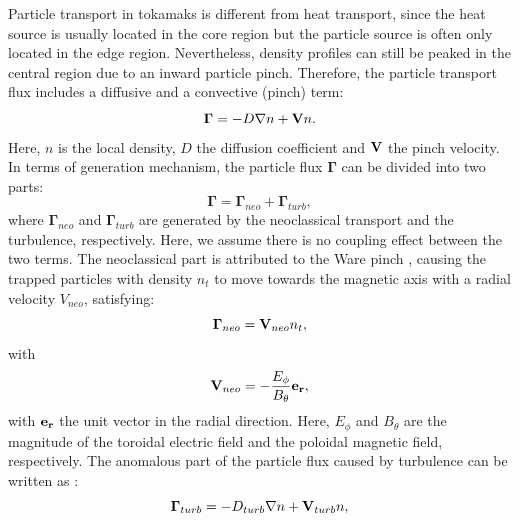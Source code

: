Particle transport in tokamaks is different from heat transport, since the heat source is usually located in the core region but the particle source is often only located in the edge region. Nevertheless, density profiles can still be peaked in the central region due to an inward particle pinch. Therefore, the particle transport flux includes a diffusive and a convective (pinch) term:%
\begin{equation}\label{eq:particle_flux}
  \boldsymbol{\Gamma} = -D\nabla n + \boldsymbol{\mathrm{V}}n.
\end{equation}
\noindent Here, $n$ is the local density, $D$ the diffusion coefficient and $\boldsymbol{\mathrm{V}}$ the pinch velocity. In terms of generation mechanism, the particle flux $\boldsymbol{\Gamma}$ can be divided into two parts:%
\begin{equation}\label{eq:neo_flux_and_turb_flux}
  \boldsymbol{\Gamma} = \boldsymbol{\Gamma}_{neo} + \boldsymbol{\Gamma}_{turb},
\end{equation}
\noindent where $\boldsymbol{\Gamma}_{neo}$ and $\boldsymbol{\Gamma}_{turb}$ are generated by the neoclassical transport and the turbulence, respectively. Here, we assume there is no coupling effect between the two terms. The neoclassical part is attributed to the Ware pinch \cite{Ware_1970_PRL}, causing the trapped particles with density $n_t$ to move towards the magnetic axis with a radial velocity $V_{neo}$, satisfying:%
\begin{equation}\label{eq:neo_flux}
  \boldsymbol{\Gamma}_{neo} = \boldsymbol{\mathrm{V}}_{neo}n_t,
\end{equation}
\noindent with
\begin{equation}\label{eq:Vneo}
  \boldsymbol{\mathrm{V}}_{neo} = -\frac{E_{\phi}}{B_{\theta}}\boldsymbol{\mathrm{e_r}},
\end{equation}
\noindent with $\boldsymbol{\mathrm{e_r}}$ the unit vector in the radial direction. Here, $E_{\phi}$ and $B_{\theta}$ are the magnitude of the toroidal electric field and the poloidal magnetic field, respectively. The anomalous part of the particle flux caused by turbulence can be written as \cite{Bourdelle_PPCF_05_review_turbulent_particle_transport}:%
\begin{equation}\label{eq:turb_flux}
  \boldsymbol{\Gamma}_{turb} = -D_{turb}{\nabla}n + \boldsymbol{\mathrm{V}}_{turb}n,
\end{equation}
